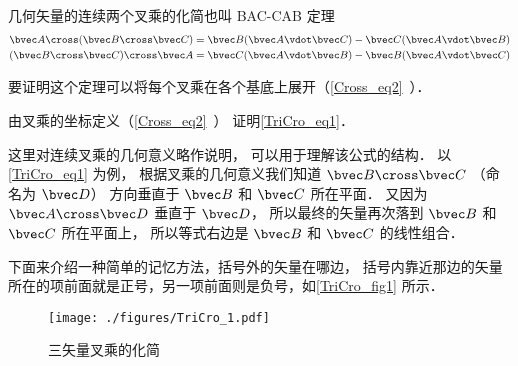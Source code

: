 

几何矢量的连续两个叉乘的化简也叫 BAC-CAB 定理
\begin{gather}
\bvec A \cross (\bvec B \cross \bvec C) = \bvec B (\bvec A \vdot \bvec C) - \bvec C (\bvec A \vdot \bvec B)\label{TriCro_eq1}\\
(\bvec B \cross \bvec C) \cross \bvec A = \bvec C (\bvec A \vdot \bvec B) - \bvec B (\bvec A \vdot \bvec C)
\end{gather}

要证明这个定理可以将每个叉乘在各个基底上展开（\autoref{Cross_eq2}~）．

\begin{exercise}{}
由叉乘的坐标定义（\autoref{Cross_eq2}~） 证明\autoref{TriCro_eq1}．
\end{exercise} 

这里对连续叉乘的几何意义略作说明， 可以用于理解该公式的结构． 以\autoref{TriCro_eq1} 为例， 根据叉乘的几何意义我们知道 $\bvec B \cross \bvec C$ （命名为 $\bvec D$） 方向垂直于 $\bvec B$ 和 $\bvec C$ 所在平面． 又因为 $\bvec A \cross \bvec D$ 垂直于 $\bvec D$， 所以最终的矢量再次落到 $\bvec B$ 和 $\bvec C$ 所在平面上， 所以等式右边是 $\bvec B$ 和 $\bvec C$ 的线性组合．

下面来介绍一种简单的记忆方法，括号外的矢量在哪边， 括号内靠近那边的矢量所在的项前面就是正号，另一项前面则是负号，如\autoref{TriCro_fig1} 所示．

\begin{figure}[ht]
\centering
\texttt{[image: ./figures/TriCro\_1.pdf]}
\caption{三矢量叉乘的化简}\label{TriCro_fig1}
\end{figure}

